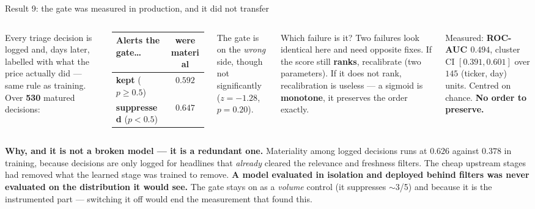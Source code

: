 \documentclass[aspectratio=169]{beamer}
\begin{document}
\begin{frame}{Result 9: the gate was measured in production, and it did not transfer}
\begin{columns}[T]
\small
Every triage decision is logged and, days later, labelled with what the price actually did ---
same rule as training. Over \textbf{530} matured decisions:
\medskip

\begin{tabular}{lc}
\toprule
\textbf{Alerts the gate\dots} & \textbf{were material} \\
\midrule
\textbf{kept} ($p \ge 0.5$) & $0.592$ \\
\textbf{suppressed} ($p < 0.5$) & $\mathbf{0.647}$ \\
\bottomrule
\end{tabular}
\medskip

{\footnotesize The gate is on the \emph{wrong} side, though not significantly
($z=-1.28$, $p=0.20$).}

\begin{block}{\small Which failure is it?}
\small Two failures look identical here and need opposite fixes. If the score still
\textbf{ranks}, recalibrate (two parameters). If it does not rank, recalibration is useless ---
a sigmoid is \textbf{monotone}, it preserves the order exactly.
\end{block}
\smallskip
{\footnotesize Measured: \textbf{ROC-AUC $0.494$}, cluster CI $[0.391, 0.601]$ over $145$
(ticker, day) units. Centred on chance. \textbf{No order to preserve.}}
\end{columns}
\vfill
{\footnotesize\textbf{Why, and it is not a broken model --- it is a redundant one.} Materiality
among logged decisions runs at $0.626$ against $0.378$ in training, because decisions are only
logged for headlines that \emph{already} cleared the relevance and freshness filters. The cheap
upstream stages had removed what the learned stage was trained to remove. \textbf{A model
evaluated in isolation and deployed behind filters was never evaluated on the distribution it
would see.} The gate stays on as a \emph{volume} control (it suppresses $\sim$3/5) and because it
is the instrumented part --- switching it off would end the measurement that found this.}
\end{frame}
\end{document}
